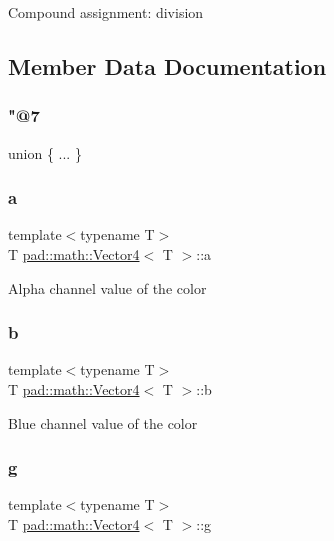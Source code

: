 Compound assignment\+: division 

\subsection{Member Data Documentation}
\mbox{\label{structpad_1_1math_1_1_vector4_a24c818c0046fb8faabb56f64405d6cda}} 
\subsubsection{\texorpdfstring{"@7}{@7}}
{\footnotesize\ttfamily union \{ ... \} }

\mbox{\label{structpad_1_1math_1_1_vector4_afb5d50917f750bbe417871b7f290b10c}} 
\subsubsection{\texorpdfstring{a}{a}}
{\footnotesize\ttfamily template$<$typename T$>$ \\
T \mbox{\hyperlink{structpad_1_1math_1_1_vector4}{pad\+::math\+::\+Vector4}}$<$ T $>$\+::a}

Alpha channel value of the color \mbox{\label{structpad_1_1math_1_1_vector4_a00d2630fa1befcfa4c343e2f4187ec71}} 
\subsubsection{\texorpdfstring{b}{b}}
{\footnotesize\ttfamily template$<$typename T$>$ \\
T \mbox{\hyperlink{structpad_1_1math_1_1_vector4}{pad\+::math\+::\+Vector4}}$<$ T $>$\+::b}

Blue channel value of the color \mbox{\label{structpad_1_1math_1_1_vector4_ac4a05c791e0522930bed20045239e870}} 
\subsubsection{\texorpdfstring{g}{g}}
{\footnotesize\ttfamily template$<$typename T$>$ \\
T \mbox{\hyperlink{structpad_1_1math_1_1_vector4}{pad\+::math\+::\+Vector4}}$<$ T $>$\+::g}

